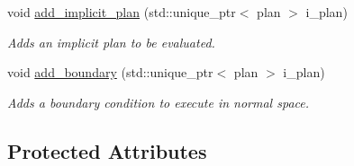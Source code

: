 \begin{DoxyCompactItemize}
void \hyperlink{classbases_1_1element_a72495325294ba811587336132c3a6b9f}{add\-\_\-implicit\-\_\-plan} (std\-::unique\-\_\-ptr$<$ plan $>$ i\-\_\-plan)
\begin{DoxyCompactList}\small\item\em Adds an implicit plan to be evaluated. \end{DoxyCompactList}\item 
void \hyperlink{classbases_1_1element_a68f28460bb9cf500fb404f2591be6a65}{add\-\_\-boundary} (std\-::unique\-\_\-ptr$<$ plan $>$ i\-\_\-plan)
\begin{DoxyCompactList}\small\item\em Adds a boundary condition to execute in normal space. \end{DoxyCompactList}\end{DoxyCompactItemize}
\subsection*{Protected Attributes}
